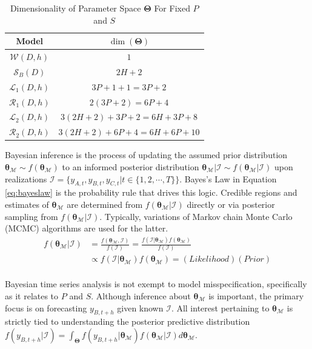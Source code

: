 \begin{table}[!h]
  \footnotesize
  \centering
  \caption{Dimensionality of Parameter Space $\bm{\Theta}$ For Fixed $P$ and $S$ }
    \begin{tabular}{cc}
    \toprule
   Model & $\dim(\bm{\Theta})$  \\
    \midrule
    $\mathcal{W}(D,h)$ & $1$ \\
    $\mathcal{S}_B(D)$ & $2H+2$ \\
    $\mathcal{L}_1(D,h)$ & $3P+1+1=3P+2$ \\
    $\mathcal{R}_1(D,h)$ & $2(3P+2)=6P+4$ \\
    $\mathcal{L}_2(D,h)$ & $3(2H+2)+ 3P+2=6H+3P+8$ \\
    $\mathcal{R}_2(D,h)$ & $3(2H+2)+6P+4=6H+6P+10$ \\
    \bottomrule
    \end{tabular}%
  \label{tab:dimtheta}%
\end{table}%

Bayesian inference is the process of updating the assumed prior distribution $\bm{\theta}_{\mathcal{M}}\sim f(\bm{\theta}_{\mathcal{M}})$ to an informed posterior distribution $\bm{\theta}_\mathcal{M}|\mathcal{I} \sim f(\bm{\theta}_\mathcal{M}|\mathcal{I})$ upon realizations  $\mathcal{I}=\{y_{A,t},y_{B,t},y_{C,t}|t \in \{1,2,\cdots,T\}\}$. Bayes's Law in Equation \ref{eq:bayeslaw} is the probability rule that drives this logic. Credible regions and estimates of $\bm{\theta}_\mathcal{M}$ are determined from $f(\bm{\theta}_\mathcal{M}|\mathcal{I})$ directly or via posterior sampling from $f(\bm{\theta}_\mathcal{M}|\mathcal{I})$. Typically, variations of Markov chain Monte Carlo (MCMC) algorithms are used for the latter.
\begin{equation}
\label{eq:bayeslaw}
\begin{split}
	f(\bm{\theta}_\mathcal{M}|\mathcal{I})&=\frac{f(\bm{\theta}_\mathcal{M},\mathcal{I})}{f(\mathcal{I})}=\frac{f(\mathcal{I}|\bm{\theta}_\mathcal{M})f(\bm{\theta}_\mathcal{M})}{f(\mathcal{I})}\\
	& \propto f(\mathcal{I}|\bm{\theta}_\mathcal{M})f(\bm{\theta}_\mathcal{M})=(Likelihood)(Prior)\\
\end{split}
\end{equation}

Bayesian time series analysis is not exempt to model misspecification, specifically as it relates to $P$ and $S$.   Although inference about $\bm{\theta}_\mathcal{M}$ is important, the primary focus is on forecasting $y_{B,t+h}$ given known $\mathcal{I}$. All interest pertaining to $\bm{\theta}_\mathcal{M}$ is strictly tied to  understanding the posterior predictive distribution $f(y_{B,t+h}|\mathcal{I})=\int_{\bm{\Theta}} f(y_{B,t+h}|\bm{\theta}_\mathcal{M})f(\bm{\theta}_\mathcal{M}|\mathcal{I}) d\bm{\theta}_\mathcal{M}$. 

